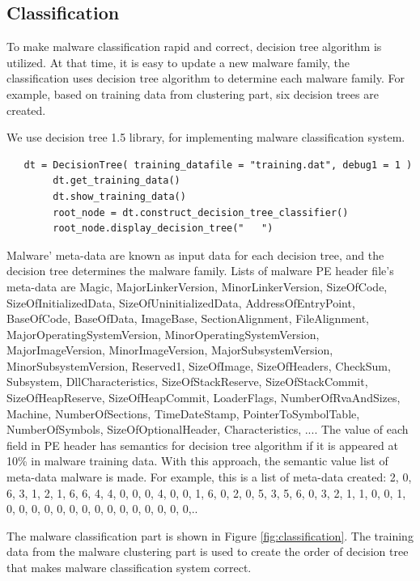 \subsection{Classification}

To make malware classification rapid and correct, decision tree algorithm is utilized. At that time, it is easy to update a new malware family, the classification uses decision tree algorithm to determine each malware family. For example, based on training data from clustering part, six decision trees are created.

We use decision tree 1.5 library, for implementing malware classification system. 
\begin{verbatim}
   dt = DecisionTree( training_datafile = "training.dat", debug1 = 1 )
        dt.get_training_data()
        dt.show_training_data()
        root_node = dt.construct_decision_tree_classifier()
        root_node.display_decision_tree("   ")
\end{verbatim}
 
Malware' meta-data are known as input data for each decision tree, and the decision tree determines the malware family. Lists of malware PE header file's meta-data are Magic, MajorLinkerVersion, MinorLinkerVersion, SizeOfCode, SizeOfInitializedData, SizeOfUninitializedData, AddressOfEntryPoint, BaseOfCode, BaseOfData, ImageBase, SectionAlignment, FileAlignment, MajorOperatingSystemVersion, MinorOperatingSystemVersion, MajorImageVersion, MinorImageVersion, MajorSubsystemVersion, MinorSubsystemVersion, Reserved1, SizeOfImage, SizeOfHeaders, CheckSum, Subsystem, DllCharacteristics, SizeOfStackReserve, SizeOfStackCommit, SizeOfHeapReserve, SizeOfHeapCommit, LoaderFlags, NumberOfRvaAndSizes, Machine, NumberOfSections, TimeDateStamp, PointerToSymbolTable, NumberOfSymbols, SizeOfOptionalHeader, Characteristics, .... The value of each field in PE header has semantics for decision tree algorithm if it is appeared at 10\% in malware training data. With this approach, the semantic value list of meta-data malware is made. For example, this is a list of meta-data created: 2, 0, 6, 3, 1, 2, 1, 6, 6, 4, 4, 0, 0, 0, 4, 0, 0, 1, 6, 0, 2, 0, 5, 3, 5, 6, 0, 3, 2, 1, 1, 0, 0, 1, 0, 0, 0, 0, 0, 0, 0, 0, 0, 0, 0, 0, 0, 0, 0,..
 
The malware classification part is shown in Figure \ref{fig:classification}. The training data from the malware clustering part is used to create the order of decision tree that makes malware classification system correct.
